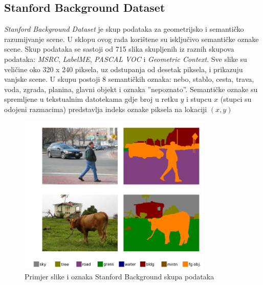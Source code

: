 \documentclass[times, utf8, diplomski, numeric]{fer}
\begin{document}
\subsection{Stanford Background Dataset}

\textit{Stanford Background Dataset}\cite{gould_09} je skup podataka za geometrijsko i semantičko razumijvanje scene. U sklopu ovog rada korištene su isključivo semantičke oznake scene. Skup podataka se sastoji od 715 slika skupljenih iz raznih skupova podataka: \textit{MSRC}, \textit{LabelME}, \textit{PASCAL VOC} i \textit{Geometric Context}. Sve slike su veličine oko 320 x 240 piksela, uz odstupanja od desetak piksela, i prikazuju vanjske scene.
U skupu postoji 8 semantičkih oznaka: nebo, stablo, cesta, trava, voda, zgrada, planina, glavni objekt i oznaka ''nepoznato''. Semantičke oznake su spremljene u tekstualnim datotekama gdje broj u retku $y$ i stupcu $x$ (stupci su odojeni razmacima) predstavlja indeks oznake piksela na lokaciji $(x, y)$

\begin{bchart}[step=5,max=40,unit=\%]
      \smallskip
      \smallskip
      \smallskip
      \smallskip
      \smallskip
      \smallskip
      \smallskip
      \smallskip
\end{bchart}

\begin{figure}[htb]
\centering
\includegraphics[width=350px]{imgs/dag-example.png}
\caption{Primjer slike i oznaka Stanford Background skupa podataka}
\label{fig:stanford_dataset}
\end{figure}
\end{document}
